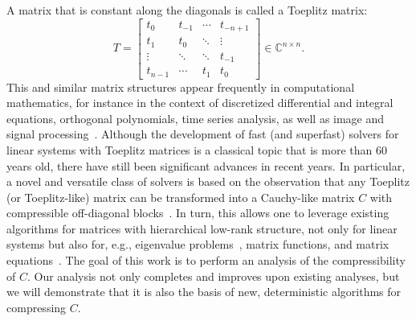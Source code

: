 \documentclass[final,reqno,onefignum,onetabnum]{siamart190516}
\newcommand{\C}{\mathbb{C}}
\begin{document}
A matrix that is constant along the diagonals is called a Toeplitz matrix:
\[
 T = \begin{bmatrix}
      t_0 & t_{-1} & \cdots & t_{-n+1} \\
      t_1 & t_0 & \ddots & \vdots  \\
      \vdots & \ddots & \ddots & t_{-1} \\
      t_{n-1} & \cdots & t_1 & t_0
     \end{bmatrix} \in \C^{n\times n}.
\]
This and similar matrix structures appear frequently in computational mathematics, for instance in the context of discretized differential and integral equations, orthogonal polynomials, time series analysis, as well as image and signal processing~\cite{antoulas2005approximation, grenander1958toeplitz, gray2006toeplitz, heinig2013algebraic, kailath1995displacement, pan2012structured}. Although the development of fast (and superfast) solvers for linear systems with Toeplitz matrices is a classical topic that is more than $60$ years old, %
there have still been significant advances in recent years. In particular, a novel and versatile class of solvers is based on the observation that any Toeplitz (or Toeplitz-like) matrix can be transformed into a Cauchy-like matrix $C$ with compressible off-diagonal blocks~\cite{chandrasekaran2007superfast, martinsson2005fast, xia2012superfast}. In turn, this allows one to leverage existing algorithms for matrices with hierarchical low-rank structure, not only for linear systems but also for, e.g., eigenvalue problems~\cite{Ou2022}, matrix functions, and matrix equations~\cite{KMR2019}.
The goal of this work is to perform an analysis of the compressibility of $C$.
Our analysis not only completes and improves upon existing analyses, but we will demonstrate that it is also the basis of new, deterministic algorithms for compressing $C$. 
\end{document}

